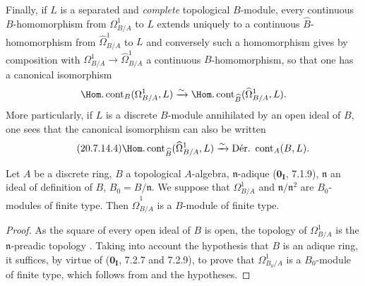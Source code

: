 \begin{env}[20.7.14]
Finally, if $L$ is a separated and \emph{complete} topological $B$-module, every continuous $B$-homomorphism from $\Omega^1_{B/A}$ to $L$ extends uniquely to a continuous $\widehat{B}$-homomorphism from $\widehat{\Omega}^1_{B/A}$ to $L$ and conversely such a homomorphism gives by composition with $\Omega^1_{B/A}\to\widehat{\Omega}^1_{B/A}$ a continuous $B$-homomorphism, so that one has a canonical isomorphism
\[
  \Hom.\operatorname{cont}_B(\Omega^1_{B/A},L)\xrightarrow{\sim}\Hom.\operatorname{cont}_{\widehat{B}}(\widehat{\Omega}^1_{B/A},L).
\]
More particularly, if $L$ is a discrete $B$-module annihilated by an open ideal of $B$, one sees that the canonical isomorphism  can also be written
\begin{equation}
\tag{20.7.14.4}
  \label{0.20.7.14.4}
  \Hom.\operatorname{cont}_{\widehat{B}}(\widehat{\Omega}^1_{B/A},L)\xrightarrow{\sim}\operatorname{D\acute{e}r.\ cont}_A(B,L).
\end{equation}
\end{env}

\begin{proposition}[20.7.15]
\label{0.20.7.15}
Let $A$ be a discrete ring, $B$ a topological $A$-algebra, $\mathfrak{n}$-adique ($\mathbf{0_I}$, 7.1.9), $\mathfrak{n}$ an ideal of definition of $B$, $B_0=B/\mathfrak{n}$.
We suppose that $\Omega^1_{B/A}$ and $\mathfrak{n}/\mathfrak{n}^2$ are $B_0$-modules of finite type.
Then $\widehat{\Omega}^1_{B/A}$ is a $B$-module of finite type.
\end{proposition}

\begin{proof}
As the square of every open ideal of $B$ is open, the topology of $\Omega^1_{B/A}$ is the $\mathfrak{n}$-preadic topology .
Taking into account the hypothesis that $B$ is an adique ring, it suffices, by virtue of ($\mathbf{0_I}$, 7.2.7 and 7.2.9), to prove that $\Omega^1_{B_0/A}$ is a $B_0$-module of finite type, which follows from  and the hypotheses.
\end{proof}
